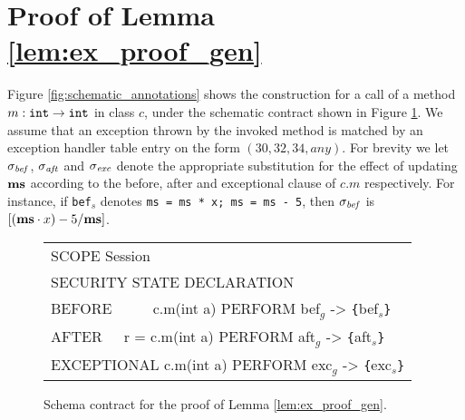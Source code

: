 \documentclass[10pt,twocolumn]{article}
\newcommand{\MS}{{\bf ms}}
\begin{document}
\section{Proof of Lemma \ref{lem:ex_proof_gen}}\label{app:proof_gen_proof}
Figure \ref{fig:schematic_annotations} shows the construction for a call of a method  $m : {\tt int} \rightarrow {\tt int}$ in class $c$, under the schematic contract shown in Figure \ref{fig:schematic_contract}. We assume that an exception thrown by the invoked method is matched by an exception handler table entry on the form $(30, 32, 34, \mathit{any})$. For brevity we let $\sigma_{\it bef}$, $\sigma_{\it aft}$ and $\sigma_{\it exc}$ denote the appropriate substitution for the effect of updating $\MS$ according to the before, after and exceptional clause of $c.m$ respectively. For instance, if {\tt bef$_s$} denotes {\tt ms = ms * x; ms = ms - 5}, then $\sigma_{\it bef}$ is $[(\MS \cdot x) - 5 / \MS]$.
\begin{figure}[!ht]
\centering
{\ttfamily
\begin{tabular}{@{}l@{}}
SCOPE Session\\
SECURITY STATE DECLARATION\\[2mm]

BEFORE~~~~~ c.m(int a) PERFORM bef$_g$ -> \verb+{+bef$_s$\verb+}+ \\
AFTER~~~r = c.m(int a) PERFORM aft$_g$ -> \verb+{+aft$_s$\verb+}+ \\
EXCEPTIONAL c.m(int a) PERFORM exc$_g$ -> \verb+{+exc$_s$\verb+}+
\end{tabular}
}
\caption{\label{fig:schematic_contract} Schema contract for the proof of Lemma \ref{lem:ex_proof_gen}.}
\end{figure}
\end{document}
